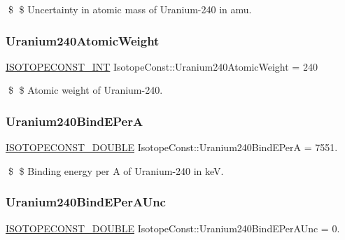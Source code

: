 \$ \$ Uncertainty in atomic mass of Uranium-\/240 in amu. \mbox{\label{group___isotope_const-_uranium-_u240_ga9d2d6b7a178b9c7bf2d50c69dfe8799b}} 
\subsubsection{\texorpdfstring{Uranium240\+Atomic\+Weight}{Uranium240AtomicWeight}}
{\footnotesize\ttfamily \mbox{\hyperlink{group___isotope_const-_macros_ga5f18360b3e99483a35c32d789e62621c}{I\+S\+O\+T\+O\+P\+E\+C\+O\+N\+S\+T\+\_\+\+I\+NT}} Isotope\+Const\+::\+Uranium240\+Atomic\+Weight = 240}

\$ \$ Atomic weight of Uranium-\/240. \mbox{\label{group___isotope_const-_uranium-_u240_gaef241038e11a3162843a4c1ddfa9a670}} 
\subsubsection{\texorpdfstring{Uranium240\+Bind\+E\+PerA}{Uranium240BindEPerA}}
{\footnotesize\ttfamily \mbox{\hyperlink{group___isotope_const-_macros_ga8f45a7272ce02c0b4c65c44636ed719a}{I\+S\+O\+T\+O\+P\+E\+C\+O\+N\+S\+T\+\_\+\+D\+O\+U\+B\+LE}} Isotope\+Const\+::\+Uranium240\+Bind\+E\+PerA = 7551.}

\$ \$ Binding energy per A of Uranium-\/240 in keV. \mbox{\label{group___isotope_const-_uranium-_u240_ga51481d0498b40f6afa76c35580a7512c}} 
\subsubsection{\texorpdfstring{Uranium240\+Bind\+E\+Per\+A\+Unc}{Uranium240BindEPerAUnc}}
{\footnotesize\ttfamily \mbox{\hyperlink{group___isotope_const-_macros_ga8f45a7272ce02c0b4c65c44636ed719a}{I\+S\+O\+T\+O\+P\+E\+C\+O\+N\+S\+T\+\_\+\+D\+O\+U\+B\+LE}} Isotope\+Const\+::\+Uranium240\+Bind\+E\+Per\+A\+Unc = 0.}

